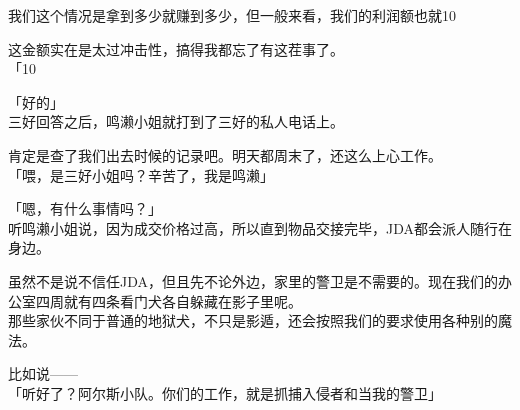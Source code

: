 我们这个情况是拿到多少就赚到多少，但一般来看，我们的利润额也就10%

这金额实在是太过冲击性，搞得我都忘了有这茬事了。\\

「10%

「好的」\\

三好回答之后，鸣濑小姐就打到了三好的私人电话上。

肯定是查了我们出去时候的记录吧。明天都周末了，还这么上心工作。\\

「喂，是三好小姐吗？辛苦了，我是鸣濑」

「嗯，有什么事情吗？」\\

听鸣濑小姐说，因为成交价格过高，所以直到物品交接完毕，JDA都会派人随行在身边。

虽然不是说不信任JDA，但且先不论外边，家里的警卫是不需要的。现在我们的办公室四周就有四条看门犬各自躲藏在影子里呢。\\

那些家伙不同于普通的地狱犬，不只是影遁，还会按照我们的要求使用各种别的魔法。

比如说——\\

「听好了？阿尔斯小队。你们的工作，就是抓捕入侵者和当我的警卫」

